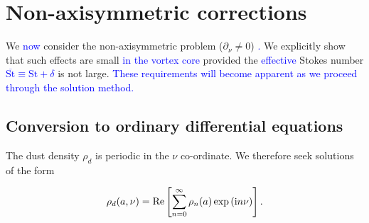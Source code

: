 \documentclass[apj]{emulateapj}
\renewcommand{\v}[1]{{\boldsymbol{#1}}} %
\def\blue#1{\textcolor{blue}{ #1}}
\newcommand{\del}{\v{\nabla}}
\newcommand{\grad}{\del}
\newcommand{\Fig}[1]{Fig.~\ref{#1}}
\newcommand{\fig}[1]{\Fig{#1}}
\newcommand{\beq}{\begin{equation}}
\newcommand{\eeq}{\end{equation}}
\begin{document}
%


\section{Non-axisymmetric corrections}
\label{sect:nonaxisymmetric} 

We \blue{now} consider the non-axisymmetric problem ($\partial_\nu\neq0$)\blue{.} 
We explicitly show that such effects are small 
\blue{in the vortex core} provided the \blue{effective} Stokes number \blue{$\overline{\mathrm{St}}\equiv\mathrm{St}+\delta$} is not large. \blue{These requirements will become
apparent as we proceed through the solution method.} 


\subsection{Conversion to ordinary differential equations}

The dust density $\rho_d$ is periodic in the $\nu$ co-ordinate. We 
therefore seek solutions of the form

\beq\label{eq:series-n}
\rho_d(a,\nu) = {\rm Re}
\left[\sum_{n=0}^\infty\rho_n(a)\exp{\left(\mathrm{i}n\nu\right)} \right].
\eeq
\end{document}
